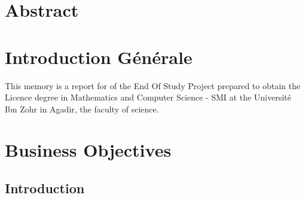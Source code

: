 \documentclass[11pt, openany]{report}
\begin{document}
\chapter*{Abstract }

  

\renewcommand{\baselinestretch}{1.30}\small \normalsize

\tableofcontents
\listoffigures
\listoftables
\renewcommand{\baselinestretch}{1.18}\small \normalsize
\newpage
{}

\chapter*{Introduction Générale }


This memory is a report for of the End Of Study Project prepared to obtain the Licence degree in Mathematics and Computer Science - SMI at the Université Ibn Zohr in Agadir, the faculty of science.\\


\vskip12mm

\clearpage   
\chapter{Business Objectives}
\section*{Introduction}
\end{document}
